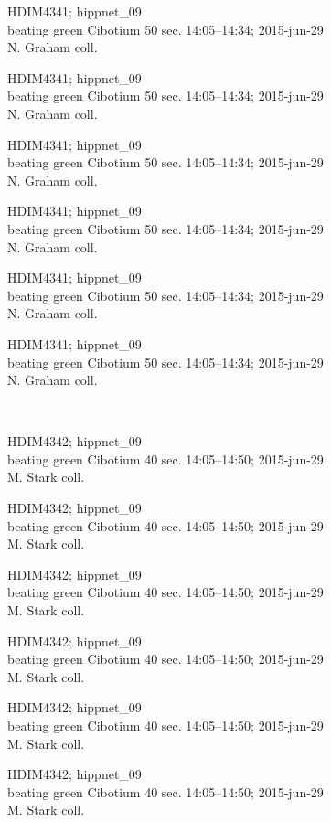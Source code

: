 \documentclass[2pt]{extarticle}
\begin{document}
\noindent
\parbox{0.16\textwidth}{\tiny \raggedright \rule[-0.3\baselineskip]{0pt}{10pt}HDIM4341; hippnet\_09\\ beating green Cibotium 50 sec. 14:05--14:34; 2015-jun-29\\ N. Graham coll.}
\parbox{0.16\textwidth}{\tiny \raggedright \rule[-0.3\baselineskip]{0pt}{10pt}HDIM4341; hippnet\_09\\ beating green Cibotium 50 sec. 14:05--14:34; 2015-jun-29\\ N. Graham coll.}
\parbox{0.16\textwidth}{\tiny \raggedright \rule[-0.3\baselineskip]{0pt}{10pt}HDIM4341; hippnet\_09\\ beating green Cibotium 50 sec. 14:05--14:34; 2015-jun-29\\ N. Graham coll.}
\parbox{0.16\textwidth}{\tiny \raggedright \rule[-0.3\baselineskip]{0pt}{10pt}HDIM4341; hippnet\_09\\ beating green Cibotium 50 sec. 14:05--14:34; 2015-jun-29\\ N. Graham coll.}
\parbox{0.16\textwidth}{\tiny \raggedright \rule[-0.3\baselineskip]{0pt}{10pt}HDIM4341; hippnet\_09\\ beating green Cibotium 50 sec. 14:05--14:34; 2015-jun-29\\ N. Graham coll.}
\parbox{0.16\textwidth}{\tiny \raggedright \rule[-0.3\baselineskip]{0pt}{10pt}HDIM4341; hippnet\_09\\ beating green Cibotium 50 sec. 14:05--14:34; 2015-jun-29\\ N. Graham coll.} \\ 
\vspace{0.001in} 

\noindent
\parbox{0.16\textwidth}{\tiny \raggedright \rule[-0.3\baselineskip]{0pt}{10pt}HDIM4342; hippnet\_09\\ beating green Cibotium 40 sec. 14:05--14:50; 2015-jun-29\\ M. Stark coll.}
\parbox{0.16\textwidth}{\tiny \raggedright \rule[-0.3\baselineskip]{0pt}{10pt}HDIM4342; hippnet\_09\\ beating green Cibotium 40 sec. 14:05--14:50; 2015-jun-29\\ M. Stark coll.}
\parbox{0.16\textwidth}{\tiny \raggedright \rule[-0.3\baselineskip]{0pt}{10pt}HDIM4342; hippnet\_09\\ beating green Cibotium 40 sec. 14:05--14:50; 2015-jun-29\\ M. Stark coll.}
\parbox{0.16\textwidth}{\tiny \raggedright \rule[-0.3\baselineskip]{0pt}{10pt}HDIM4342; hippnet\_09\\ beating green Cibotium 40 sec. 14:05--14:50; 2015-jun-29\\ M. Stark coll.}
\parbox{0.16\textwidth}{\tiny \raggedright \rule[-0.3\baselineskip]{0pt}{10pt}HDIM4342; hippnet\_09\\ beating green Cibotium 40 sec. 14:05--14:50; 2015-jun-29\\ M. Stark coll.}
\parbox{0.16\textwidth}{\tiny \raggedright \rule[-0.3\baselineskip]{0pt}{10pt}HDIM4342; hippnet\_09\\ beating green Cibotium 40 sec. 14:05--14:50; 2015-jun-29\\ M. Stark coll.} \\ 
\vspace{0.001in} 
\end{document}
